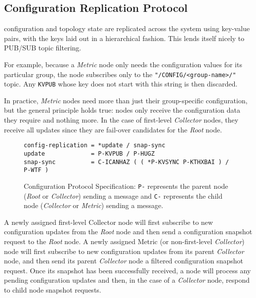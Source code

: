 \subsection{Configuration Replication Protocol}
\label{proto_config}

\dcamp configuration and topology state are replicated across the system using key-value pairs, with the keys laid out
in a hierarchical fashion. This lends itself nicely to PUB/SUB topic filtering.

For example, because a \textit{Metric} node only needs the configuration values for its particular group, the node
subscribes only to the \texttt{"/CONFIG/<group-name>/"} topic. Any \texttt{KVPUB} whose key does not start with this
string is then discarded.

In practice, \textit{Metric} nodes need more than just their group-specific configuration, but the general principle
holds true: nodes only receive the configuration data they require and nothing more. In the case of first-level
\textit{Collector} nodes, they receive all updates since they are fail-over candidates for the \textit{Root} node.

\begin{figure}[H]
\vspace{+10pt}
\begin{verbatim}
config-replication = *update / snap-sync
update             = P-KVPUB / P-HUGZ
snap-sync          = C-ICANHAZ ( ( *P-KVSYNC P-KTHXBAI ) / P-WTF )
\end{verbatim}
\vspace{-5pt}
\caption[Configuration Protocol Specification]
	{Configuration Protocol Specification: \texttt{P-} represents the parent node (\textit{Root} or
	 \textit{Collector}) sending a message and \texttt{C-} represents the child node (\textit{Collector} or
	 \textit{Metric}) sending a message.}
\label{fig:proto_config_spec}
\end{figure}

A newly assigned first-level Collector node will first subscribe to new configuration updates from the \textit{Root}
node and then send a configuration snapshot request to the \textit{Root} node. A newly assigned Metric (or
non-first-level \textit{Collector}) node will first subscribe to new configuration updates from its parent
\textit{Collector} node, and then send its parent \textit{Collector} node a filtered configuration snapshot request.
Once its snapshot has been successfully received, a node will process any pending configuration updates and then, in the
case of a \textit{Collector} node, respond to child node snapshot requests.

